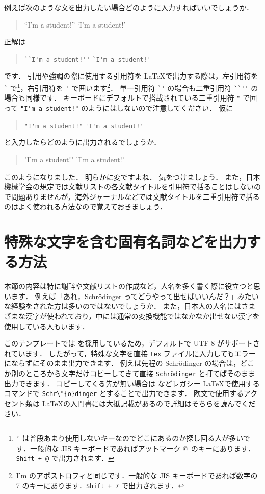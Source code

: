 例えば次のような文を出力したい場合どのように入力すればいいでしょうか．
\begin{quotation}
    ``I'm a student!'' \qquad `I'm a student!'
\end{quotation}
正解は
\begin{quotation}
    \verb|``I'm a student!''| \qquad \verb|`I'm a student!'|
\end{quotation}
です．
引用や強調の際に使用する引用符を \LaTeX で出力する際は，左引用符を \verb|`| で\footnote{\texttt{`} は普段あまり使用しないキーなのでどこにあるのか探し回る人が多いです．一般的な JIS キーボードであればアットマーク @ のキーにあります．\texttt{Shift + @} で出力されます．}，右引用符を \verb|'| で囲います\footnote{I'm のアポストロフィと同じです．一般的な JIS キーボードであれば数字の 7 のキーにあります．\texttt{Shift + 7} で出力されます．}．
単一引用符 \verb|`'| の場合も二重引用符 \verb|``''| の場合も同様です．
キーボードにデフォルトで搭載されている二重引用符 \verb|"| で囲って \verb|"I'm a student!"| のようにはしないので注意してください．
仮に
\begin{quotation}
    \verb|"I'm a student!"| \qquad \verb|'I'm a student!'|
\end{quotation}
と入力したらどのように出力されるでしょうか．
\begin{quotation}
    "I'm a student!" \qquad 'I'm a student!'
\end{quotation}
このようになりました．
明らかに変ですよね．
気をつけましょう．
また，日本機械学会の規定では文献リストの各文献タイトルを引用符で括ることはしないので問題ありませんが，海外ジャーナルなどでは文献タイトルを二重引用符で括るのはよく使われる方法なので覚えておきましょう．

\section{特殊な文字を含む固有名詞などを出力する方法}
\label{sec:unicode}

本節の内容は特に謝辞や文献リストの作成など，人名を多く書く際に役立つと思います．
例えば「あれ，Schrödinger ってどうやって出せばいいんだ？」みたいな経験をされた方は多いのではないでしょうか．
また，日本人の人名にはさまざまな漢字が使われており，中には通常の変換機能ではなかなか出せない漢字を使用している人もいます．

このテンプレートでは \LuaLaTeX を採用しているため，デフォルトで UTF-8 がサポートされています．
したがって，特殊な文字を直接 \verb|tex| ファイルに入力してもエラーにならずにそのまま出力できます．
例えば先程の Schrödinger の場合は，どこか別のところから文字だけコピーしてきて直接 \verb|Schrödinger| と打てばそのまま出力できます．
コピーしてくる先が無い場合は \pLaTeX などレガシー \LaTeX で使用するコマンドで \verb|Schr\"{o}dinger| とすることで出力できます．
欧文で使用するアクセント類は \LaTeX の入門書には大抵記載があるので詳細はそちらを読んでください．

